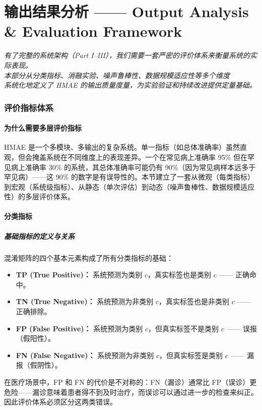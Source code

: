 \documentclass[11pt,a4paper]{ctexart}
\theoremstyle{remark}
\begin{document}
\part{输出结果分析 —— Output Analysis \& Evaluation Framework}

\vspace{6pt}
\begin{center}
\small
\textit{有了完整的系统架构（Part I--III），我们需要一套严密的评价体系来衡量系统的实际表现。}\\
\textit{本部分从分类指标、消融实验、噪声鲁棒性、数据规模适应性等多个维度}\\
\textit{系统化地定义了 HMAE 的输出质量度量，为实验验证和持续改进提供定量基础。}
\end{center}
\vspace{12pt}

\section{评价指标体系}

\subsection{为什么需要多层评价指标}

HMAE 是一个多模块、多输出的复杂系统。单一指标（如总体准确率）虽然直观，但会掩盖系统在不同维度上的表现差异。一个在常见病上准确率 95\% 但在罕见病上准确率 30\% 的系统，其总体准确率可能仍有 90\%（因为常见病样本远多于罕见病）——这 90\% 的数字是有误导性的。本节建立了一套从微观（每类指标）到宏观（系统级指标）、从静态（单次评估）到动态（噪声鲁棒性、数据规模适应性）的多层评价体系。

\subsection{分类指标}

\subsubsection{基础指标的定义与关系}

混淆矩阵的四个基本元素构成了所有分类指标的基础：
\begin{itemize}[nosep]
\item \textbf{TP (True Positive)：} 系统预测为类别 $c$，真实标签也是类别 $c$ —— 正确命中。
\item \textbf{TN (True Negative)：} 系统预测为非类别 $c$，真实标签也是非类别 $c$ —— 正确排除。
\item \textbf{FP (False Positive)：} 系统预测为类别 $c$，但真实标签不是类别 $c$ —— 误报（假阳性）。
\item \textbf{FN (False Negative)：} 系统预测为非类别 $c$，但真实标签是类别 $c$ —— 漏报（假阴性）。
\end{itemize}
在医疗场景中，FP 和 FN 的代价是不对称的：FN（漏诊）通常比 FP（误诊）更危险——漏诊意味着患者得不到及时治疗，而误诊可以通过进一步的检查来纠正。因此评价体系必须区分这两类错误。
\end{document}
